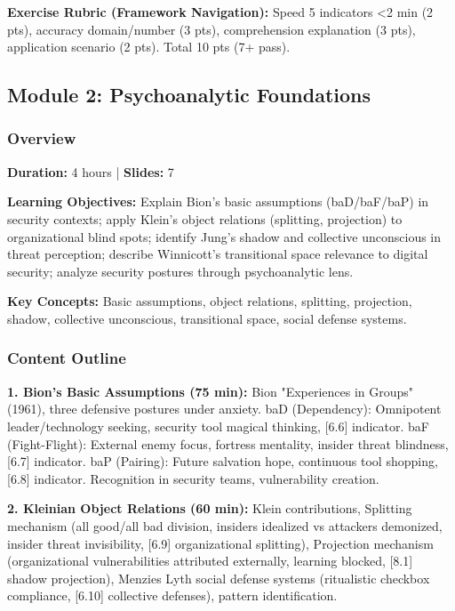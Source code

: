 \documentclass[11pt,a4paper]{article}
\begin{document}
\textbf{Exercise Rubric (Framework Navigation):} Speed 5 indicators <2 min (2 pts), accuracy domain/number (3 pts), comprehension explanation (3 pts), application scenario (2 pts). Total 10 pts (7+ pass).

\subsection{Module 2: Psychoanalytic Foundations}

\subsubsection{Overview}
\textbf{Duration:} 4 hours | \textbf{Slides:} 7

\textbf{Learning Objectives:} Explain Bion's basic assumptions (baD/baF/baP) in security contexts; apply Klein's object relations (splitting, projection) to organizational blind spots; identify Jung's shadow and collective unconscious in threat perception; describe Winnicott's transitional space relevance to digital security; analyze security postures through psychoanalytic lens.

\textbf{Key Concepts:} Basic assumptions, object relations, splitting, projection, shadow, collective unconscious, transitional space, social defense systems.

\subsubsection{Content Outline}
\textbf{1. Bion's Basic Assumptions (75 min):} Bion "Experiences in Groups" (1961), three defensive postures under anxiety. baD (Dependency): Omnipotent leader/technology seeking, security tool magical thinking, [6.6] indicator. baF (Fight-Flight): External enemy focus, fortress mentality, insider threat blindness, [6.7] indicator. baP (Pairing): Future salvation hope, continuous tool shopping, [6.8] indicator. Recognition in security teams, vulnerability creation.

\textbf{2. Kleinian Object Relations (60 min):} Klein contributions, Splitting mechanism (all good/all bad division, insiders idealized vs attackers demonized, insider threat invisibility, [6.9] organizational splitting), Projection mechanism (organizational vulnerabilities attributed externally, learning blocked, [8.1] shadow projection), Menzies Lyth social defense systems (ritualistic checkbox compliance, [6.10] collective defenses), pattern identification.
\end{document}
